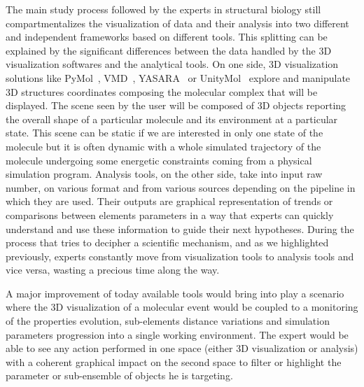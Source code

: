 \documentclass{vgtc}                          %
\begin{document}
The main study process followed by the experts in structural biology still compartmentalizes the visualization of data and their analysis into two different and independent frameworks based on different tools.
This splitting can be explained by the significant differences between the data handled by the 3D visualization softwares and the analytical tools.
On one side, 3D visualization solutions like PyMol~\cite{delano_pymol_2002}, VMD~\cite{humphrey_vmd:_1996}, YASARA~\cite{krieger2014yasara} or UnityMol~\cite{lv2013game} explore and manipulate 3D structures coordinates composing the molecular complex that will be displayed. The scene seen by the user will be composed of 3D objects reporting the overall shape of a particular molecule and its environment at a particular state. This scene can be static if we are interested in only one state of the molecule but it is often dynamic with a whole simulated trajectory of the molecule undergoing some energetic constraints coming from a physical simulation program.
Analysis tools, on the other side, take into input raw number, on various format and from various sources depending on the pipeline in which they are used. Their outputs are graphical representation of trends or comparisons between elements parameters in a way that experts can quickly understand and use these information to guide their next hypotheses.
During the process that tries to decipher a scientific mechanism, and as we highlighted previously, experts constantly move from visualization tools to analysis tools and vice versa, wasting a precious time along the way.

A major improvement of today available tools would bring into play a scenario where the 3D visualization of a molecular event would be coupled to a monitoring of the properties evolution, sub-elements distance variations and simulation parameters progression into a single working environment. The expert would be able to see any action performed in one space (either 3D visualization or analysis) with a coherent graphical impact on the second space to filter or highlight the parameter or sub-ensemble of objects he is targeting.
\end{document}
